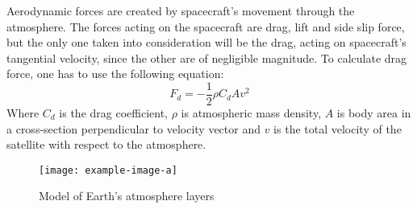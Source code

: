         Aerodynamic forces are created by spacecraft's movement through the atmosphere. The forces acting on the spacecraft are drag, lift and side slip force, but the only one taken into consideration will be the drag, acting on spacecraft's tangential velocity, since the other are of negligible magnitude. To calculate drag force, one has to use the following equation:
        \begin{equation}
            F_d = -\frac{1}{2}\rho C_d A v^2
        \end{equation}
        Where $C_d$ is the drag coefficient, $\rho$ is atmospheric mass density, $A$ is body area in a cross-section perpendicular to velocity vector and $v$ is the total velocity of the satellite with respect to the atmosphere. 

        \begin{figure}[hb]
            \centering
            \texttt{[image: example-image-a]}
            \caption{Model of Earth's atmosphere layers}
            \label{fig:atmosphere}
        \end{figure}


